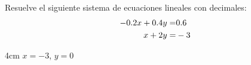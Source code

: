Resuelve el siguiente sistema de ecuaciones lineales con decimales:
        \begin{align*}\Large%
            -0.2x+0.4y= & 0.6 \\
            x+2y=       & -3
        \end{align*}

        \begin{solutionbox}{4cm}
            $x=-3$, $y=0$
        \end{solutionbox}
    